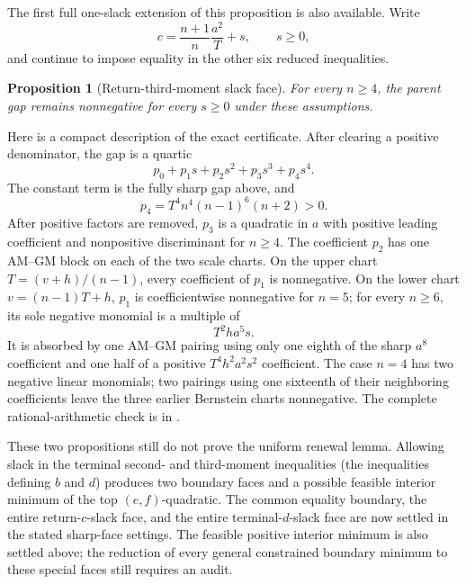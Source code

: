 \documentclass[11pt]{article}
\newtheorem{proposition}[theorem]{Proposition}
\theoremstyle{remark}
\begin{document}
The first full one-slack extension of this proposition is also available.
Write
\[
 c=\frac{n+1}{n}\frac{a^2}{T}+s,\qquad s\geq0,
\]
and continue to impose equality in the other six reduced inequalities.

\begin{proposition}[Return-third-moment slack face]
\label{prop:k4-return-third-slack}
For every \(n\geq4\), the parent gap remains nonnegative for every \(s\geq0\)
under these assumptions.
\end{proposition}

Here is a compact description of the exact certificate.  After clearing a
positive denominator, the gap is a quartic
\[
 p_0+p_1s+p_2s^2+p_3s^3+p_4s^4.
\]
The constant term is the fully sharp gap above, and
\[
 p_4=T^4n^4(n-1)^6(n+2)>0.
\]
After positive factors are removed, \(p_3\) is a quadratic in \(a\) with
positive leading coefficient and nonpositive discriminant for \(n\geq4\).
The coefficient \(p_2\) has one AM--GM block on each of the two scale charts.
On the upper chart \(T=(v+h)/(n-1)\), every coefficient of \(p_1\) is
nonnegative.  On the lower chart \(v=(n-1)T+h\), \(p_1\) is coefficientwise
nonnegative for \(n=5\); for every \(n\geq6\), its sole negative monomial is a
multiple of
\[
 T^2ha^5s.
\]
It is absorbed by one AM--GM pairing using only one eighth of the sharp
\(a^8\) coefficient and one half of a positive \(T^4h^2a^2s^2\) coefficient.
The case \(n=4\) has two negative linear monomials; two pairings using one
sixteenth of their neighboring coefficients leave the three earlier
Bernstein charts nonnegative.  The complete rational-arithmetic check is in
.

These two propositions still do not prove the uniform renewal lemma.  Allowing
slack in the terminal second- and third-moment inequalities (the inequalities
defining \(b\) and \(d\)) produces two boundary faces and a possible feasible
interior minimum of the top \((e,f)\)-quadratic.  The common equality boundary,
the entire return-\(c\)-slack face, and the entire terminal-\(d\)-slack face are
now settled in the stated sharp-face settings. The feasible positive
interior minimum is also settled above; the reduction of every general
constrained boundary minimum to these special faces still requires an audit.
\end{document}
